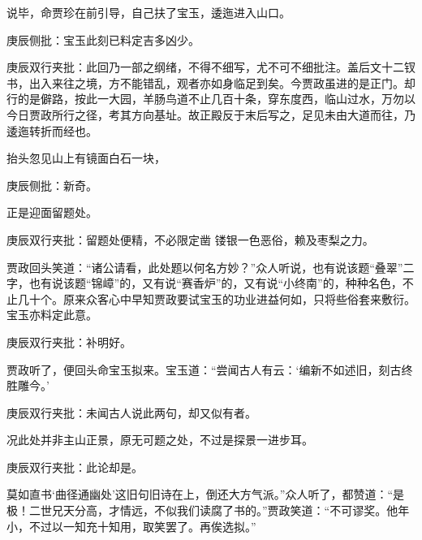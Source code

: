 \begin{parag}


    说毕，命贾珍在前引导，自己扶了宝玉，逶迤进入山口。\begin{note}庚辰侧批：宝玉此刻已料定吉多凶少。\end{note}\begin{note}庚辰双行夹批：此回乃一部之纲绪，不得不细写，尤不可不细批注。盖后文十二钗书，出入来往之境，方不能错乱，观者亦如身临足到矣。今贾政虽进的是正门。却行的是僻路，按此一大园，羊肠鸟道不止几百十条，穿东度西，临山过水，万勿以今日贾政所行之径，考其方向基址。故正殿反于末后写之，足见未由大道而往，乃逶迤转折而经也。\end{note}抬头忽见山上有镜面白石一块，\begin{note}庚辰侧批：新奇。\end{note}正是迎面留题处。\begin{note}庚辰双行夹批：留题处便精，不必限定凿 镂银一色恶俗，赖及枣梨之力。\end{note}贾政回头笑道：“诸公请看，此处题以何名方妙？”众人听说，也有说该题“叠翠”二字，也有说该题“锦嶂”的，又有说“赛香炉”的，又有说“小终南”的，种种名色，不止几十个。原来众客心中早知贾政要试宝玉的功业进益何如，只将些俗套来敷衍。宝玉亦料定此意。\begin{note}庚辰双行夹批：补明好。\end{note}贾政听了，便回头命宝玉拟来。宝玉道：“尝闻古人有云：‘编新不如述旧，刻古终胜雕今。’\begin{note}庚辰双行夹批：未闻古人说此两句，却又似有者。\end{note}况此处并非主山正景，原无可题之处，不过是探景一进步耳。\begin{note}庚辰双行夹批：此论却是。\end{note}莫如直书‘曲径通幽处’这旧句旧诗在上，倒还大方气派。”众人听了，都赞道：“是极！二世兄天分高，才情远，不似我们读腐了书的。”贾政笑道：“不可谬奖。他年小，不过以一知充十知用，取笑罢了。再俟选拟。”
\end{parag}



